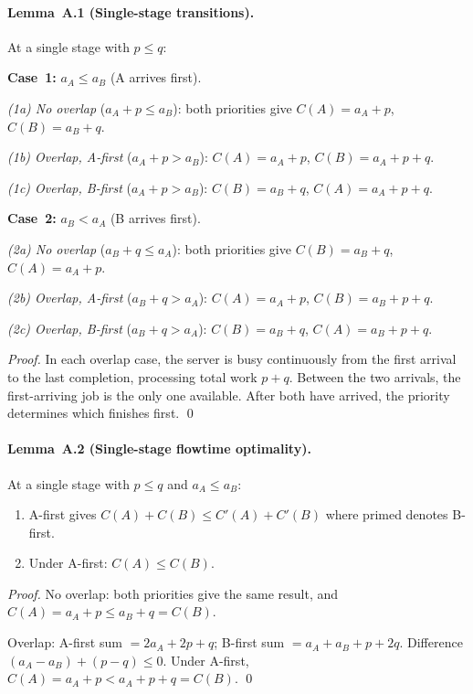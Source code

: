 \documentclass[11pt,titlepage]{article}
\begin{document}
\paragraph{Lemma~A.1 (Single-stage transitions).}
At a single stage with $p \leq q$:

\smallskip\noindent
\textbf{Case~1:} $a_A \leq a_B$ (A arrives first).

\emph{(1a) No overlap} ($a_A + p \leq a_B$): both priorities
give
$C(A) = a_A + p$, $C(B) = a_B + q$.

\emph{(1b) Overlap, A-first} ($a_A + p > a_B$):
$C(A) = a_A + p$, $C(B) = a_A + p + q$.

\emph{(1c) Overlap, B-first} ($a_A + p > a_B$):
$C(B) = a_B + q$, $C(A) = a_A + p + q$.

\smallskip\noindent
\textbf{Case~2:} $a_B < a_A$ (B arrives first).

\emph{(2a) No overlap} ($a_B + q \leq a_A$): both priorities
give
$C(B) = a_B + q$, $C(A) = a_A + p$.

\emph{(2b) Overlap, A-first} ($a_B + q > a_A$):
$C(A) = a_A + p$, $C(B) = a_B + p + q$.

\emph{(2c) Overlap, B-first} ($a_B + q > a_A$):
$C(B) = a_B + q$, $C(A) = a_B + p + q$.

\smallskip\noindent
\emph{Proof.}
In each overlap case, the server is busy continuously from
the first arrival to the last completion, processing total
work $p + q$. Between the two arrivals, the first-arriving
job is the only one available. After both have arrived, the
priority determines which finishes first. \qed

\paragraph{Lemma~A.2 (Single-stage flowtime optimality).}
At a single stage with $p \leq q$ and $a_A \leq a_B$:
\begin{enumerate}
\item[\textup{(i)}] A-first gives
  $C(A) + C(B) \leq C'(A) + C'(B)$
  where primed denotes B-first.
\item[\textup{(ii)}] Under A-first: $C(A) \leq C(B)$.
\end{enumerate}

\smallskip\noindent
\emph{Proof.}
No overlap: both priorities give the same result, and
$C(A) = a_A + p \leq a_B + q = C(B)$.

Overlap: A-first sum $= 2a_A + 2p + q$;
B-first sum $= a_A + a_B + p + 2q$.
Difference $(a_A - a_B) + (p - q) \leq 0$.
Under A-first, $C(A) = a_A + p < a_A + p + q = C(B)$. \qed
\end{document}
